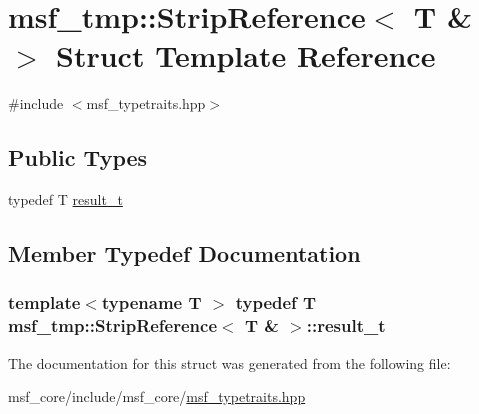 \hypertarget{structmsf__tmp_1_1StripReference_3_01T_01_6_01_4}{\section{msf\-\_\-tmp\-:\-:Strip\-Reference$<$ T \& $>$ Struct Template Reference}
\label{structmsf__tmp_1_1StripReference_3_01T_01_6_01_4}
}


{\ttfamily \#include $<$msf\-\_\-typetraits.\-hpp$>$}

\subsection*{Public Types}
\begin{DoxyCompactItemize}
\item 
typedef T \hyperlink{structmsf__tmp_1_1StripReference_3_01T_01_6_01_4_a3c52c9c3462d4be0736e5820c2121b68}{result\-\_\-t}
\end{DoxyCompactItemize}


\subsection{Member Typedef Documentation}
\hypertarget{structmsf__tmp_1_1StripReference_3_01T_01_6_01_4_a3c52c9c3462d4be0736e5820c2121b68}{
\subsubsection[{result\-\_\-t}]{\setlength{\rightskip}{0pt plus 5cm}template$<$typename T $>$ typedef T {\bf msf\-\_\-tmp\-::\-Strip\-Reference}$<$ T \& $>$\-::{\bf result\-\_\-t}}}\label{structmsf__tmp_1_1StripReference_3_01T_01_6_01_4_a3c52c9c3462d4be0736e5820c2121b68}


The documentation for this struct was generated from the following file\-:\begin{DoxyCompactItemize}
\item 
msf\-\_\-core/include/msf\-\_\-core/\hyperlink{msf__typetraits_8hpp}{msf\-\_\-typetraits.\-hpp}\end{DoxyCompactItemize}
